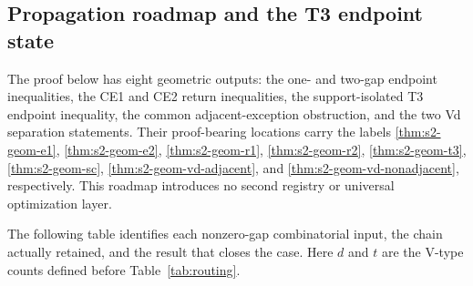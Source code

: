 \subsection{Propagation roadmap and the T3 endpoint state}
\label{sec:strategy2-reader}

The proof below has eight geometric outputs: the one- and two-gap endpoint
inequalities, the CE1 and CE2 return inequalities, the support-isolated T3
endpoint inequality, the common adjacent-exception obstruction, and the two
Vd separation statements. Their proof-bearing locations carry the labels
\ref{thm:s2-geom-e1}, \ref{thm:s2-geom-e2},
\ref{thm:s2-geom-r1}, \ref{thm:s2-geom-r2},
\ref{thm:s2-geom-t3}, \ref{thm:s2-geom-sc},
\ref{thm:s2-geom-vd-adjacent}, and
\ref{thm:s2-geom-vd-nonadjacent}, respectively. This roadmap introduces no
second registry or universal optimization layer.

The following table identifies each nonzero-gap combinatorial input, the
chain actually retained, and the result that closes the case.  Here $d$ and
$t$ are the V-type counts defined before Table~\ref{tab:routing}.

